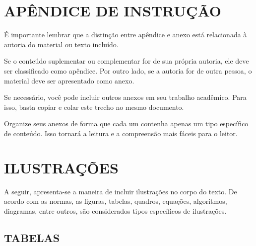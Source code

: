 
\begin{apendicesenv}
    \partapendices


    \chapter{APÊNDICE DE INSTRUÇÃO}
    \label{apendice_a}

    É importante lembrar que a distinção entre apêndice e anexo está relacionada à autoria do material ou texto incluído.

    Se o conteúdo suplementar ou complementar for de sua própria autoria, ele deve ser classificado como apêndice. Por outro lado, se a autoria for de outra pessoa, o material deve ser apresentado como anexo.

    Se necessário, você pode incluir outros anexos em seu trabalho acadêmico. Para isso, basta copiar e colar este trecho no mesmo documento.

    Organize seus anexos de forma que cada um contenha apenas um tipo específico de conteúdo. Isso tornará a leitura e a compreensão mais fáceis para o leitor.


    \chapter{ILUSTRAÇÕES}
    \label{ilustracoes}

    A seguir, apresenta-se a maneira de incluir ilustrações no corpo do texto. De acordo com as normas, as figuras, tabelas, quadros, equações, algoritmos, diagramas, entre outros, são considerados tipos específicos de ilustrações.

    \section{TABELAS}
    \label{tabelas}


\end{apendicesenv}
